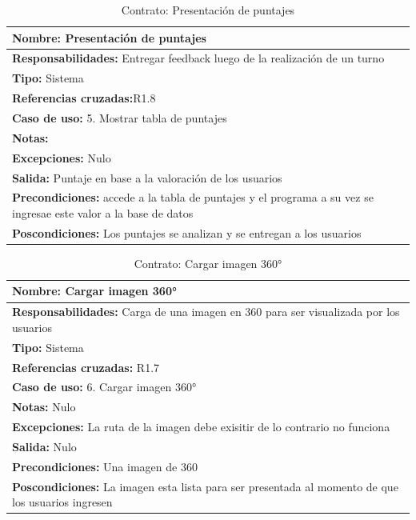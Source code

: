 \begin{table}[H]
    \begin{center}
        \begin{tabular}{| m{15cm} |}        
        	\hline 
        	\textbf{Nombre:} Presentación de puntajes \\
        	\hline
        	\textbf{Responsabilidades: }Entregar feedback luego de la realización de un turno \\
        	\hline
        	\textbf{Tipo:} Sistema \\
        	\hline
        	\textbf{Referencias cruzadas:}R1.8 \\
        	\hline
        	\textbf{Caso de uso:} 5. Mostrar tabla de puntajes\\
        	\hline
        	\textbf{Notas:} \\
        	\hline
        	\textbf{Excepciones:} Nulo \\
        	\hline
        	\textbf{Salida:} Puntaje en base a la valoración de los usuarios\\
        	\hline
        	\textbf{Precondiciones:}  accede a la tabla de puntajes y el programa a su vez se ingresae este valor a la base de datos \\
        	\hline
        	\textbf{Poscondiciones:} Los puntajes se analizan y se entregan a los usuarios\\
        	\hline
        \end{tabular}
    \caption{Contrato: Presentación de puntajes}
    \label{Contrato5}
    \end{center}
\end{table}

\begin{table}[H]
    \begin{center}
        \begin{tabular}{| m{15cm} |}          
        	\hline 
        	\textbf{Nombre:} Cargar imagen 360°\\
        	\hline
        	\textbf{Responsabilidades:} Carga de una imagen en 360 para ser visualizada por los usuarios\\
        	\hline
        	\textbf{Tipo:} Sistema\\
        	\hline
        	\textbf{Referencias cruzadas:} R1.7\\
        	\hline
        	\textbf{Caso de uso:} 6. Cargar imagen 360°\\
        	\hline
        	\textbf{Notas:} Nulo\\
        	\hline
        	\textbf{Excepciones:} La ruta de la imagen debe exisitir de lo contrario no funciona\\
        	\hline
        	\textbf{Salida:} Nulo\\
        	\hline
        	\textbf{Precondiciones:} Una imagen de 360 \\
        	\hline
        	\textbf{Poscondiciones:} La imagen esta lista para ser presentada al momento de que los usuarios ingresen\\
        	\hline
        \end{tabular}
    \caption{Contrato: Cargar imagen 360°}
    \label{Contrato6}
    \end{center}
\end{table}

